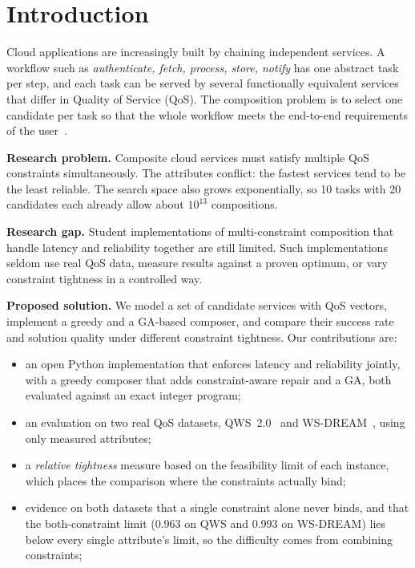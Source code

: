 \documentclass[conference]{IEEEtran}
\begin{document}
\section{Introduction}
Cloud applications are increasingly built by chaining independent services. A workflow such as \emph{authenticate, fetch, process, store, notify} has one abstract task per step, and each task can be served by several functionally equivalent services that differ in Quality of Service (QoS). The composition problem is to select one candidate per task so that the whole workflow meets the end-to-end requirements of the user~\cite{sheng2014,jula2014}.

\textbf{Research problem.} Composite cloud services must satisfy multiple QoS constraints simultaneously. The attributes conflict: the fastest services tend to be the least reliable. The search space also grows exponentially, so 10 tasks with 20 candidates each already allow about $10^{13}$ compositions.

\textbf{Research gap.} Student implementations of multi-constraint composition that handle latency and reliability together are still limited. Such implementations seldom use real QoS data, measure results against a proven optimum, or vary constraint tightness in a controlled way.

\textbf{Proposed solution.} We model a set of candidate services with QoS vectors, implement a greedy and a GA-based composer, and compare their success rate and solution quality under different constraint tightness. Our contributions are:
\begin{itemize}
\item an open Python implementation that enforces latency and reliability jointly, with a greedy composer that adds constraint-aware repair and a GA, both evaluated against an exact integer program;
\item an evaluation on two real QoS datasets, QWS~2.0~\cite{almasri2007,almasri2008} and WS-DREAM~\cite{zheng2014}, using only measured attributes;
\item a \emph{relative tightness} measure based on the feasibility limit of each instance, which places the comparison where the constraints actually bind;
\item evidence on both datasets that a single constraint alone never binds, and that the both-constraint limit (0.963 on QWS and 0.993 on WS-DREAM) lies below every single attribute's limit, so the difficulty comes from combining constraints;
\end{itemize}
\end{document}
